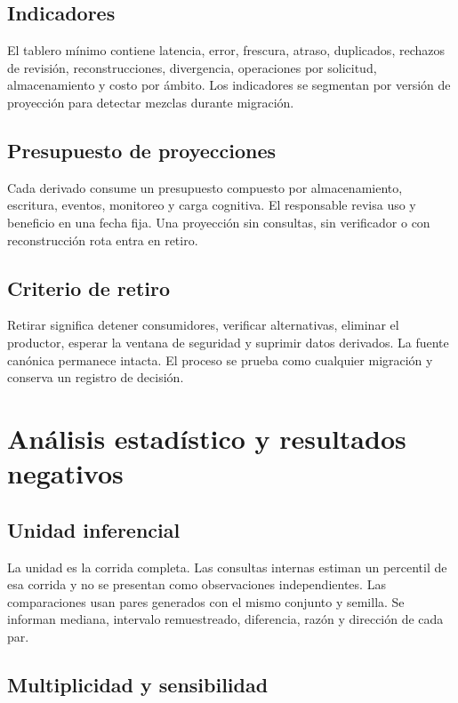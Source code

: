\section{Indicadores}

El tablero mínimo contiene latencia, error, frescura, atraso, duplicados, rechazos de
revisión, reconstrucciones, divergencia, operaciones por solicitud, almacenamiento y
costo por ámbito. Los indicadores se segmentan por versión de proyección para detectar
mezclas durante migración.

\section{Presupuesto de proyecciones}

Cada derivado consume un presupuesto compuesto por almacenamiento, escritura, eventos,
monitoreo y carga cognitiva. El responsable revisa uso y beneficio en una fecha fija.
Una proyección sin consultas, sin verificador o con reconstrucción rota entra en retiro.

\section{Criterio de retiro}

Retirar significa detener consumidores, verificar alternativas, eliminar el productor,
esperar la ventana de seguridad y suprimir datos derivados. La fuente canónica permanece
intacta. El proceso se prueba como cualquier migración y conserva un registro de decisión.

\chapter{Análisis estadístico y resultados negativos}

\section{Unidad inferencial}

La unidad es la corrida completa. Las consultas internas estiman un percentil de esa
corrida y no se presentan como observaciones independientes. Las comparaciones usan
pares generados con el mismo conjunto y semilla. Se informan mediana, intervalo
remuestreado, diferencia, razón y dirección de cada par.

\section{Multiplicidad y sensibilidad}

